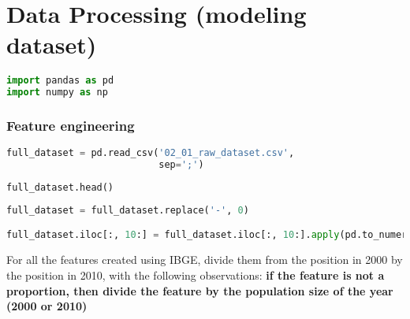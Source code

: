 \hypertarget{data-processing-modeling-dataset}{%
\section{Data Processing (modeling
dataset)}\label{data-processing-modeling-dataset}}

\begin{lstlisting}[language=Python]
import pandas as pd
import numpy as np
\end{lstlisting}

\hypertarget{feature-engineering}{%
\subsubsection{Feature engineering}\label{feature-engineering}}

\begin{lstlisting}[language=Python]
full_dataset = pd.read_csv('02_01_raw_dataset.csv',
                           sep=';')
\end{lstlisting}

\begin{lstlisting}[language=Python]
full_dataset.head()
\end{lstlisting}

\begin{lstlisting}[language=Python]
full_dataset = full_dataset.replace('-', 0)

full_dataset.iloc[:, 10:] = full_dataset.iloc[:, 10:].apply(pd.to_numeric)
\end{lstlisting}

For all the features created using IBGE, divide them from the position
in 2000 by the position in 2010, with the following observations:
\textbf{if the feature is not a proportion, then divide the feature by
the population size of the year (2000 or 2010)}

